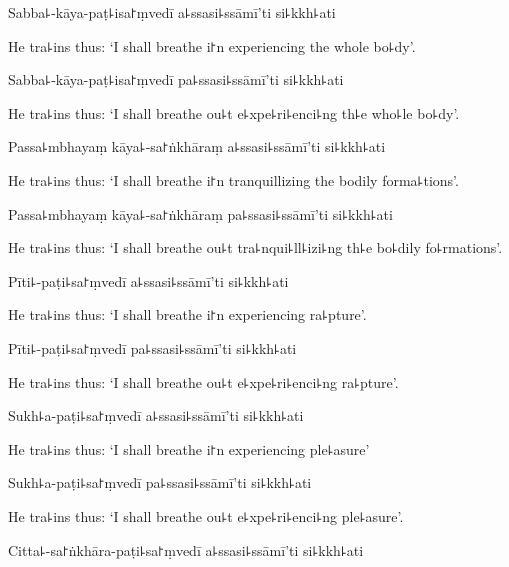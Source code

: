 Sabba꜕-kāya-paṭ꜕isa꜓ṃvedī a꜕ssasi꜕ssāmī'ti si꜕kkh꜕ati

\begin{english}
  He tra꜕ins thus: `I shall breathe i꜓n experiencing the whole bo꜕dy'.
\end{english}

Sabba꜕-kāya-paṭ꜕isa꜓ṃvedī pa꜕ssasi꜕ssāmī'ti si꜕kkh꜕ati

\begin{english}
  He tra꜕ins thus: `I shall breathe ou꜕t e꜕xpe꜕ri꜕enci꜕ng th꜕e who꜕le bo꜕dy'.
\end{english}

Passa꜕mbhayaṃ kāya꜕-sa꜓ṅkhāraṃ a꜕ssasi꜕ssāmī'ti si꜕kkh꜕ati

\begin{english}
  He tra꜕ins thus: `I shall breathe i꜓n tranquillizing the bodily forma꜕tions'.
\end{english}

Passa꜕mbhayaṃ kāya꜕-sa꜓ṅkhāraṃ pa꜕ssasi꜕ssāmī'ti si꜕kkh꜕ati

\begin{english}
  He tra꜕ins thus: `I shall breathe ou꜕t tra꜕nqui꜕ll꜕izi꜕ng th꜕e bo꜕dily fo꜕rmations'.
\end{english}

Pīti꜕-paṭi꜕sa꜓ṃvedī a꜕ssasi꜕ssāmī'ti si꜕kkh꜕ati

\begin{english}
  He tra꜕ins thus: `I shall breathe i꜓n experiencing ra꜕pture'.
\end{english}

Pīti꜕-paṭi꜕sa꜓ṃvedī pa꜕ssasi꜕ssāmī'ti si꜕kkh꜕ati

\begin{english}
  He tra꜕ins thus: `I shall breathe ou꜕t e꜕xpe꜕ri꜕enci꜕ng ra꜕pture'.
\end{english}

Sukh꜕a-paṭi꜕sa꜓ṃvedī a꜕ssasi꜕ssāmī'ti si꜕kkh꜕ati

\begin{english}
  He tra꜕ins thus: `I shall breathe i꜓n experiencing ple꜕asure'
\end{english}

Sukh꜕a-paṭi꜕sa꜓ṃvedī pa꜕ssasi꜕ssāmī'ti si꜕kkh꜕ati

\begin{english}
  He tra꜕ins thus: `I shall breathe ou꜕t e꜕xpe꜕ri꜕enci꜕ng ple꜕asure'.
\end{english}

Citta꜕-sa꜓ṅkhāra-paṭi꜕sa꜓ṃvedī a꜕ssasi꜕ssāmī'ti si꜕kkh꜕ati

